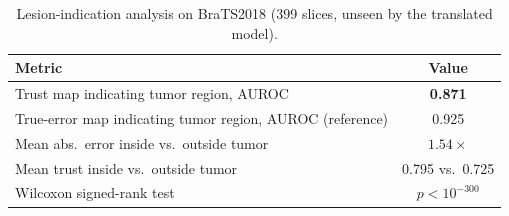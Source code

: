 \begin{table}[htbp]
\centering\small
\caption{Lesion-indication analysis on BraTS2018 (399 slices, unseen by the
translated model).}
\label{tab:lesion_en}
\begin{tabular}{lc}
\toprule
Metric & Value \\
\midrule
Trust map indicating tumor region, AUROC & \textbf{0.871} \\
True-error map indicating tumor region, AUROC (reference) & 0.925 \\
Mean abs.\ error inside vs.\ outside tumor & $1.54\times$ \\
Mean trust inside vs.\ outside tumor & 0.795 vs.\ 0.725 \\
Wilcoxon signed-rank test & $p<10^{-300}$ \\
\bottomrule
\end{tabular}
\end{table}
